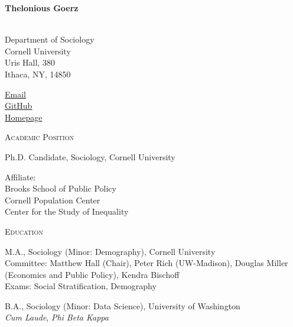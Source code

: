 \documentclass[10pt, letterpaper]{article}
\newcommand{\years}[1]{\marginnote{\small #1}}
\newenvironment{sectionbody}
  {\begin{list}{}{\setlength{\leftmargin}{50pt}\setlength{\topsep}{2pt}\setlength{\partopsep}{0pt}}\item[]}
  {\end{list}}
\newcommand{\sectionheading}[1]{%
  \vspace{0.5em}
  \noindent
  \makebox[0pt][l]{\rule[-.5\baselineskip]{\linewidth}{.1mm}}%
  \textsc{#1}\par\nobreak
  \vspace{0.4em}
}
\begin{document}
{\LARGE\textbf{Thelonious Goerz}}\\[0.4em]
\vspace{0.3em}
\makebox[0pt][l]{\rule[-.5\baselineskip]{\linewidth}{.1mm}} \\

\begin{minipage}[t]{0.5\textwidth}
  Department of Sociology \\
  Cornell University \\
  Uris Hall, 380 \\ 
  Ithaca, NY, 14850 \\
\end{minipage}
\hfill
\begin{minipage}[t]{0.45\textwidth}
  \raggedleft
{} \href{mailto:theloniouslgoerz@gmail.com}{Email}\\ %
 \href{https://github.com/theloniousgoerz/}{GitHub}\\ %
 \href{theloniousgoerz.github.io}{Homepage} \\
\end{minipage}

\sectionheading{Academic Position}
\begin{sectionbody}
\years{2023--}
Ph.D. Candidate, Sociology, Cornell University

\vspace{0.3em}
Affiliate: \\
\hspace{1em}Brooks School of Public Policy\\
\hspace{1em}Cornell Population Center\\
\hspace{1em}Center for the Study of Inequality
\end{sectionbody}
\sectionheading{Education}
\begin{sectionbody}

\years{2025} M.A., Sociology (Minor: Demography), Cornell University \\
\footnotesize Committee: Matthew Hall (Chair), Peter Rich (UW-Madison), Douglas Miller (Economics and Public Policy), Kendra Bischoff \\
\footnotesize Exams: Social Stratification, Demography
\end{sectionbody}
\begin{sectionbody}
\years{2021} B.A., Sociology (Minor: Data Science), University of Washington\\
\emph{Cum Laude}, \textit{Phi Beta Kappa}
\end{sectionbody}
\end{document}

